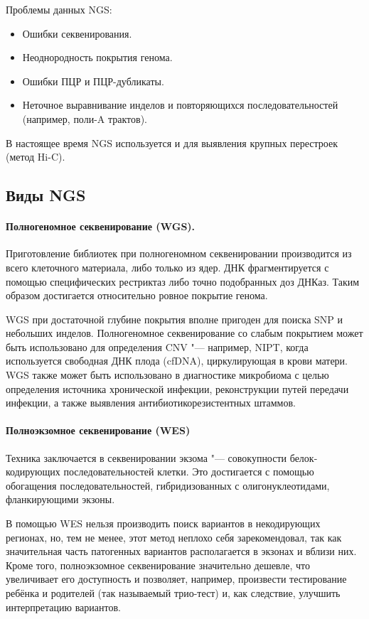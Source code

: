 \documentclass[a4paper,12pt]{article}
\begin{document}
Проблемы данных NGS:

\begin{itemize}
\item Ошибки секвенирования.
\item Неоднородность покрытия генома.
\item Ошибки ПЦР и ПЦР-дубликаты.
\item Неточное выравнивание инделов и повторяющихся последовательностей (например, поли-A трактов).
\end{itemize}

В настоящее время NGS используется и для выявления крупных перестроек (метод Hi-C).

\subsection{Виды NGS}

\paragraph{Полногеномное секвенирование (WGS).}
Приготовление библиотек при полногеномном секвенировании производится из всего клеточного материала, либо только из ядер.
ДНК фрагментируется с помощью специфических рестриктаз либо точно подобранных доз ДНКаз.
Таким образом достигается относительно ровное покрытие генома.

WGS при достаточной глубине покрытия вполне пригоден для поиска SNP и небольших инделов.
Полногеномное секвенирование со слабым покрытием может быть использовано для определения CNV "--- например, NIPT, когда используется свободная ДНК плода (cfDNA), циркулирующая в крови матери\cite{yu}.
WGS также может быть использовано в диагностике микробиома с целью определения источника хронической инфекции, реконструкции путей передачи инфекции, а также выявления антибиотикорезистентных штаммов\cite{balloux}.

\paragraph{Полноэкзомное секвенирование (WES)}
Техника заключается в секвенировании экзома "--- совокупности белок-кодирующих последовательностей клетки.
Это достигается с помощью обогащения последовательностей, гибридизованных с олигонуклеотидами, фланкирующими экзоны.

В помощью WES нельзя производить поиск вариантов в некодирующих регионах, но, тем не менее, этот метод неплохо себя зарекомендовал, так как значительная часть патогенных вариантов располагается в экзонах и вблизи них.
Кроме того, полноэкзомное секвенирование значительно дешевле, что увеличивает его доступность и позволяет, например, произвести тестирование ребёнка и родителей (так называемый трио-тест) и, как следствие, улучшить интерпретацию вариантов\cite{yohe}.
\end{document}

